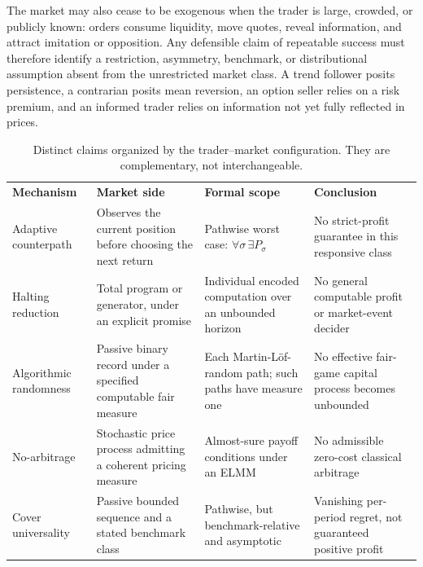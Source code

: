 \documentclass[aps,pra,reprint,superscriptaddress,amsmath,amssymb,floatfix]{revtex4-2}
\theoremstyle{plain}
\theoremstyle{definition}
\theoremstyle{remark}
\begin{document}
The market may also cease to be exogenous when the trader is large, crowded,
or publicly known: orders consume liquidity, move quotes, reveal information,
and attract imitation or opposition. Any defensible claim of repeatable
success must therefore identify a restriction, asymmetry, benchmark, or
distributional assumption absent from the unrestricted market class. A trend
follower posits persistence, a contrarian posits mean reversion, an option
seller relies on a risk premium, and an informed trader relies on information
not yet fully reflected in prices.

\begin{table}[t]
\caption{\label{tab:claimmap}Distinct claims organized by the trader--market
configuration. They are complementary, not interchangeable.}
\centering
\begin{ruledtabular}
\begin{tabular}{p{}p{}p{}p{}}
\textbf{Mechanism} & \textbf{Market side} & \textbf{Formal scope}
& \textbf{Conclusion} \\
\colrule
Adaptive counterpath
& Observes the current position before choosing the next return
& Pathwise worst case:
\(\forall\sigma\,\exists P_\sigma\)
& No strict-profit guarantee in this responsive class \\
Halting reduction
& Total program or generator, under an explicit promise
& Individual encoded computation over an unbounded horizon
& No general computable profit or market-event decider \\
Algorithmic randomness
& Passive binary record under a specified computable fair measure
& Each Martin-L\"of-random path; such paths have measure one
& No effective fair-game capital process becomes unbounded \\
No-arbitrage
& Stochastic price process admitting a coherent pricing measure
& Almost-sure payoff conditions under an ELMM
& No admissible zero-cost classical arbitrage \\
Cover universality
& Passive bounded sequence and a stated benchmark class
& Pathwise, but benchmark-relative and asymptotic
& Vanishing per-period regret, not guaranteed positive profit \\
\end{tabular}
\end{ruledtabular}
\end{table}
\end{document}

